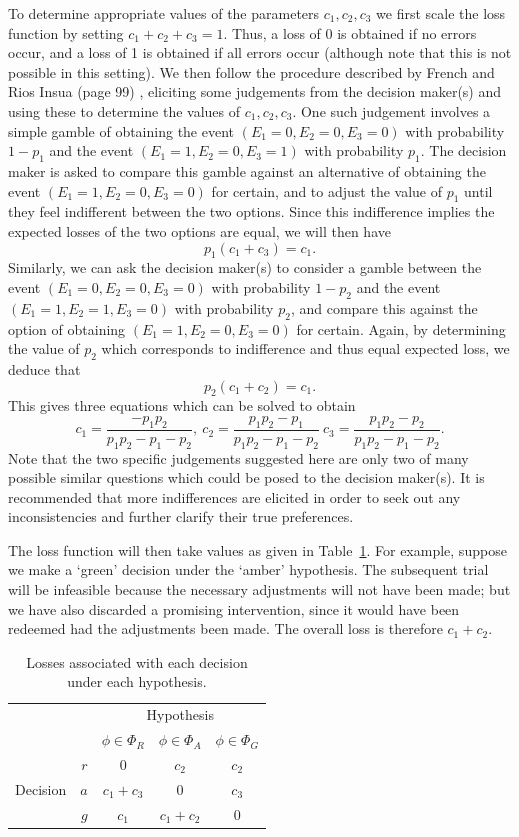 \documentclass[AMA,STIX1COL]{WileyNJD-v2}
\begin{document}
To determine appropriate values of the parameters $c_1, c_2, c_3$ we first scale the loss function by setting $c_1 + c_2 + c_3 = 1$. Thus, a loss of 0 is obtained if no errors occur, and a loss of 1 is obtained if all errors occur (although note that this is not possible in this setting). We then follow the procedure described by French and Rios Insua (page 99) \cite{French2000}, eliciting some judgements from the decision maker(s) and using these to determine the values of $c_1, c_2, c_3$. One such judgement involves a simple gamble of obtaining the event $(E_1 = 0, E_2 = 0, E_3 = 0)$ with probability $1 - p_1$ and the event $(E_1 = 1, E_2 = 0, E_3 = 1)$ with probability $p_1$. The decision maker is asked to compare this gamble against an alternative of obtaining the event $(E_1 = 1, E_2 = 0, E_3 = 0)$ for certain, and to adjust the value of $p_1$ until they feel indifferent between the two options. Since this indifference implies the expected losses of the two options are equal, we will then have
$$
p_1 (c_1 +  c_3)  = c_1.
$$
Similarly, we can ask the decision maker(s) to consider a gamble between the event $(E_1 = 0, E_2 = 0, E_3 = 0)$ with probability $1 - p_2$ and the event $(E_1 = 1, E_2 = 1, E_3 = 0)$ with probability $p_2$, and compare this against the option of obtaining $(E_1 = 1, E_2 = 0, E_3 = 0)$ for certain. Again, by determining the value of $p_2$ which corresponds to indifference and thus equal expected loss, we deduce that
$$
p_2(c_1 + c_2) = c_1.
$$
This gives three equations which can be solved to obtain
$$
c_1 = \frac{-p_1 p_2}{p_1 p_2 - p_1 - p_2}, ~ c_2 = \frac{p_1 p_2 - p_1}{p_1 p_2 - p_1 - p_2} ~ c_3 = \frac{p_1 p_2 - p_2}{p_1 p_2 - p_1 - p_2}.
$$
Note that the two specific judgements suggested here are only two of many possible similar questions which could be posed to the decision maker(s). It is recommended that more indifferences are elicited in order to seek out any inconsistencies and further clarify their true preferences.

The loss function will then take values as given in Table~\ref{tab:loss}. For example, suppose we make a `green' decision under the `amber' hypothesis. The subsequent trial will be infeasible because the necessary adjustments will not have been made; but we have also discarded a promising intervention, since it would have been redeemed had the adjustments been made. The overall loss is therefore $c_{1} + c_{2}$.

\begin{table}
\caption{Losses associated with each decision under each hypothesis.}
\centering
\begin{tabular}{r r c c c}
\toprule
& & \multicolumn{3}{c}{Hypothesis} \\
& & $\phi \in \Phi_{R}$ & $\phi \in \Phi_{A}$ & $\phi \in \Phi_{G}$ \\
\midrule
\multirow{3}{*}{Decision} & $r$ & 0 & $c_{2}$ & $c_{2}$ \\
 & $a$ & $c_{1} + c_{3}$ & 0 & $c_{3}$ \\
 & $g$ & $c_{1}$ & $c_{1} + c_{2}$ & 0  \\
\bottomrule
\end{tabular}
\label{tab:loss}
\end{table}
\end{document}
